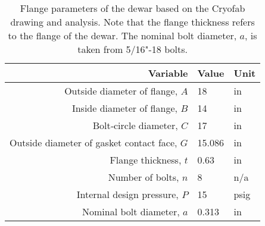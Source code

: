 \begin{table}[h]
\begin{center}
\tabcolsep=10pt
\begin{tabular}{r|l|l}
\hline
\hline
Variable & Value & Unit \\
\hline
Outside diameter of flange, $A$ & 18 & in \\
Inside diameter of flange, $B$ & 14 & in \\
Bolt‐circle diameter, $C$ & 17 & in \\
Outside diameter of gasket contact face, $G$ & 15.086 & in \\
Flange thickness, $t$ & 0.63 & in \\
Number of bolts, $n$ & 8 & n/a \\
Internal design pressure, $P$ & 15 & psig \\
Nominal bolt diameter, $a$ & 0.313 & in \\
\hline
\hline
\end{tabular}
\caption{Flange parameters of the dewar based on the Cryofab drawing
and analysis.  Note that the flange thickness refers to the flange
of the dewar.  The nominal bolt diameter, $a$, is taken from 5/16"-18 bolts.}
\label{table:ring_flange}
\end{center}
\end{table}
